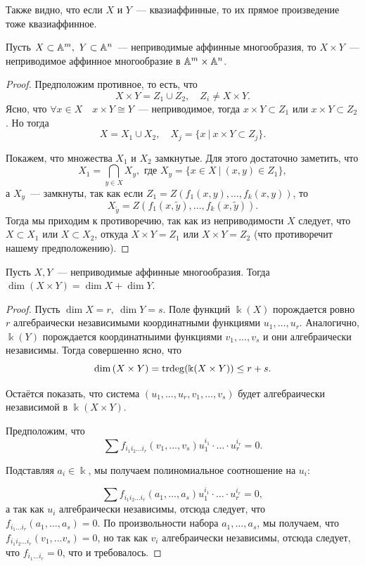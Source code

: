     	Также видно, что если $X$ и $Y$~--- квазиаффинные, то их прямое произведение тоже квазиаффинное. 

    	\begin{statement}\label{direct_product_of_irr} \hypertarget{bilet_13}{} 
    		Пусть $X \subset \AA^m, \ Y \subset \AA^n$~--- неприводимые аффинные многообразия, то $X \times Y$~--- неприводимое аффинное многообразие в $\AA^{m} \times \AA^{n}$.
    	\end{statement}
	    	\begin{proof}
	    		Предположим противное, то есть, что 
	    		\[
	    			X \times Y = Z_1 \cup Z_2, \quad Z_i \neq X \times Y. 
	    		\]
	    		Ясно, что $\forall x \in X \quad x \times Y \cong Y$~--- неприводимое, тогда $x \times Y \subset Z_1$ или $x \times Y \subset Z_2$. Но тогда 
	    		\[
	    			X = X_1 \cup X_2, \quad X_j = \{ x \ \vert \ x \times Y \subset Z_j \}.
	    		\]

	    		Покажем, что множества $X_1$ и $X_2$ замкнутые. Для этого достаточно заметить, что 
	    		\[
	    			X_1 = \bigcap_{y \in X} X_{y}, \text{ где } X_y = \{ x \in X \ \vert \ (x, y) \in Z_1 \},
	    		\]
	    		а $X_y$~--- замкнуты, так как если $Z_1 = Z(f_1(x, y), \ldots, f_k(x, y))$, то 
	    		\[
	    			X_{\widetilde{y}} = Z(f_1(x, \widetilde{y}), \ldots, f_k(x, \widetilde{y})).
	    		\]
	    		Тогда мы приходим к противоречию, так как из неприводимости $X$ следует, что $X \subset X_1$ или $X \subset X_2$, откуда $X \times Y = Z_1$ или $X \times Y = Z_2$ (что противоречит нашему предположению). 

		\end{proof}
	   \begin{statement}\hypertarget{bilet_14}{} 
	    	Пусть $X, Y$~--- неприводимые аффинные многообразия. Тогда $\dim{(X \times Y)} = \dim{X} + \dim{Y}$.
    	\end{statement} 	
    	\begin{proof}
    		Пусть $\dim{X} = r, \ \dim{Y} = s$. Поле функций $\Bbbk(X)$ порождается ровно  $r$ алгебраически независимыми координатными функциями $u_1, \ldots, u_r$. Аналогично, $\Bbbk(Y)$ порождается координатныими функциями $v_1, \ldots, v_s$ и они алгебраически независимы. Тогда совершенно ясно, что 
	\[
		\dim{(X \times Y)} = \mathrm{trdeg}\lr*{\Bbbk(X \times Y)} \le r + s.
	\]

	Остаётся показать, что система $(u_1, \ldots, u_r, v_1, \ldots, v_s)$ будет алгебраически независимой в $\Bbbk(X \times Y)$. 

	Предположим, что 
	\[
		\sum f_{i_1 i_2 \ldots i_r}(v_1, \ldots, v_s) u_1^{i_1} \cdot \ldots \cdot u_{r}^{i_r} = 0.
	\]

	Подставляя $a_i \in \Bbbk$, мы получаем полиномиальное соотношение на $u_i:$

	\[
		\sum f_{i_1 i_2 \ldots i_r}(a_1, \ldots, a_s) u_1^{i_1} \cdot \ldots \cdot u_{r}^{i_r} = 0,
	\]
	а так как $u_i$ алгебраически независимы, отсюда следует, что $f_{i_1 \ldots i_r}(a_1, \ldots, a_s) = 0$. По произвольности набора  $a_1, \ldots, a_s$, мы получаем, что $f_{i_1 i_2 \ldots i_r}(v_1, \ldots v_s) = 0$, но так как $v_i$ алгебраически независимы, отсюда следует, что $f_{i_1 \ldots i_r} = 0$, что и требовалось. 
    	\end{proof}

